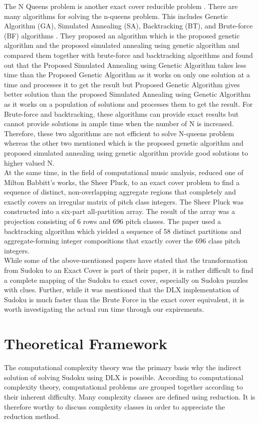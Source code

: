 \documentclass[a4paper,oneside,11pt]{report}
\newcounter{row}
\begin{document}
	The N Queens problem is another exact cover reducible problem \cite{Knuth}. There are many algorithms for solving the n-queens problem. This includes Genetic Algorithm (GA), Simulated Annealing (SA), Backtracking (BT), and Brute-force (BF) algorithms \cite{Mukherjee}. They proposed an algorithm which is the proposed genetic algorithm and the proposed simulated annealing using genetic algorithm and compared them together with brute-force and backtracking algorithms and found out that the Proposed Simulated Annealing using Genetic Algorithm takes less time than the Proposed Genetic Algorithm as it works on only one solution at a time and processes it to get the result but Proposed Genetic Algorithm gives better solution than the proposed Simulated Annealing using Genetic Algorithm as it works on a population of solutions and processes them to get the result. For Brute-force and backtracking, these algorithms can provide exact results but cannot provide solutions in ample time when the number of N is increased. Therefore, these two algorithms are not efficient to solve N-queens problem whereas the other two mentioned which is the proposed genetic algorithm and proposed simulated annealing using genetic algorithm provide good solutions to higher valued N.\\
	
	At the same time, in the field of computational music analysis, \cite{Bemman} reduced one of Milton Babbitt’s works, the Sheer Pluck, to an exact cover problem to find a sequence of distinct, non-overlapping aggregate regions that completely and exactly covers an irregular matrix of pitch class integers. The Sheer Pluck was constructed into a six-part all-partition array. The result of the array was a projection consisting of 6 rows and 696 pitch classes. The paper used a backtracking algorithm which yielded a sequence of 58 distinct partitions and aggregate-forming integer compositions that exactly cover the 696 class pitch integers.\\
	
While some of the above-mentioned papers have stated that the transformation from Sudoku to an Exact Cover is part of their paper, it is rather difficult to find a complete mapping of the Sudoku to exact cover, especially on Sudoku puzzles with clues. Further, while it was mentioned that the DLX implementation of Sudoku is much faster than the Brute Force in the exact cover equivalent, it is worth investigating the actual run time through our expirements.

\chapter{Theoretical Framework}
The computational complexity theory was the primary basis why the indirect solution of solving Sudoku using DLX is possible. According to computational complexity theory, computational problems are grouped together according to their inherent difficulty. Many complexity classes are defined using reduction. It is therefore worthy to discuss complexity classes in order to appreciate the reduction method.\\
\end{document}

